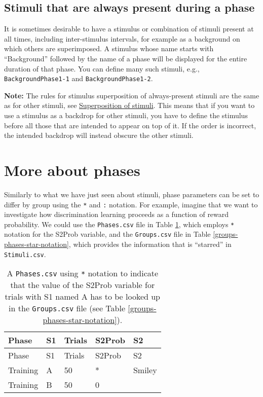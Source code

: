 \documentclass[11pt,]{article}
\begin{document}
\subsection{Stimuli that are always present during a
phase}\label{stimuli-that-are-always-present-during-a-phase}

It is sometimes desirable to have a stimulus or combination of stimuli
present at all times, including inter-stimulus intervals, for example as
a background on which others are superimposed. A stimulus whose name
starts with ``Background'' followed by the name of a phase will be
displayed for the entire duration of that phase. You can define many
such stimuli, e.g., \texttt{BackgroundPhase1-1} and
\texttt{BackgroundPhase1-2}.

\textbf{Note:} The rules for stimulus superposition of always-present
stimuli are the same as for other stimuli, see
\hyperref[stimulus-superposition]{Superposition of stimuli}. This means
that if you want to use a stimulus as a backdrop for other stimuli, you
have to define the stimulus before all those that are intended to appear
on top of it. If the order is incorrect, the intended backdrop will
instead obscure the other stimuli.

\section{More about phases}\label{more-about-phases}

Similarly to what we have just seen about stimuli, phase parameters can
be set to differ by group using the \texttt{*} and \texttt{:} notation.
For example, imagine that we want to investigate how discrimination
learning proceeds as a function of reward probability. We could use the
\texttt{Phases.csv} file in Table \ref{phases-star-notation}, which
employs \texttt{*} notation for the S2Prob variable, and the
\texttt{Groups.csv} file in Table \ref{groups-phases-star-notation},
which provides the information that is ``starred'' in
\texttt{Stimuli.csv}.

\begin{longtable}[c]{@{}lllll@{}}
\caption{A \texttt{Phases.csv} using \texttt{*} notation to indicate
that the value of the S2Prob variable for trials with S1 named A has to
be looked up in the \texttt{Groups.csv} file (see Table
\ref{groups-phases-star-notation}).
\label{phases-star-notation}}\tabularnewline
\toprule
Phase & S1 & Trials & S2Prob & S2\tabularnewline
\midrule
\endfirsthead
\toprule
Phase & S1 & Trials & S2Prob & S2\tabularnewline
\midrule
\endhead
Training & A & 50 & * & Smiley\tabularnewline
Training & B & 50 & 0 &\tabularnewline
\bottomrule
\end{longtable}
\end{document}
